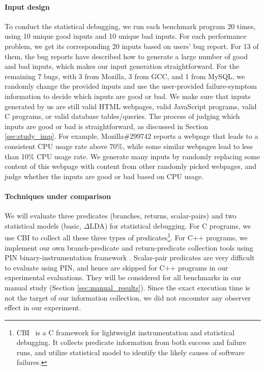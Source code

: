\paragraph{Input design}
To conduct the statistical debugging, we run each benchmark program 20 times, using
10 unique good inputs and 10 unique bad inputs.
For each performance problem, we get its corresponding 20 inputs based on users'
bug report. For 13 of them, the bug reports have described
how to generate a large number of good and bad inputs, which makes our input
generation straightforward. For the remaining 7 bugs, with 3 from Mozilla, 3 
from GCC, and 1 from MySQL, we randomly
change the provided inputs and use the user-provided failure-symptom
information to decide which inputs are good or bad.
We make sure that inputs generated by us are still valid HTML webpages, valid JavaScript programs,
valid C programs, or valid database tables/queries.
The process of judging which inputs
are good or bad is straightforward,
as discussed in Section \ref{sec:study_imp}.
For example, Mozilla\#299742 reports a webpage that leads to a consistent
CPU usage rate above 70\%, while some similar webpages lead to less than 10\% 
CPU usage rate. We generate many inputs by randomly replacing some content of this 
webpage with content from other randomly picked webpages, and judge whether
the inputs are good or bad based on CPU usage. 

\paragraph{Techniques under comparison}
We will evaluate three predicates (branches, returns, scalar-pairs)
and two statistical models (basic, $\Delta$LDA) for statistical debugging.
For C programs, we use CBI \citep{liblit03,liblit05} to collect all these
three types of predicates\footnote{
CBI~\citep{liblit03,liblit05} 
is a C framework for lightweight instrumentation and statistical debugging. 
It collects predicate information from both success and failure runs,
and utilize statistical 
model to identify the likely causes of software failures. 
}.
For C++ programs, we implement our own branch-predicate and
return-predicate collection tools using
PIN binary-instrumentation framework \citep{pin}.
Scalar-pair predicates are very difficult to evaluate using PIN, 
and hence are skipped for C++ programs in our experimental evaluations.
They will be considered for all benchmarks in our manual study 
(Section \ref{sec:manual_results}).
Since the exact execution time is not the target of our information collection,
we did not encounter any observer effect in our experiment.

